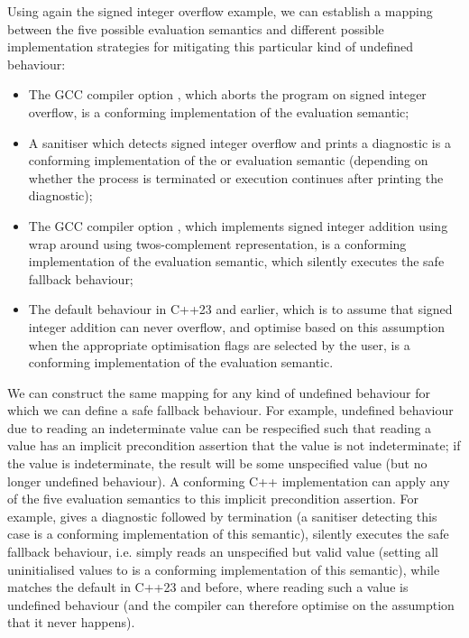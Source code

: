 Using again the signed integer overflow example, we can establish a mapping between the five  possible evaluation semantics and different possible implementation strategies for mitigating this particular kind of undefined behaviour:
\begin{itemize}
\item The GCC compiler option , which aborts the program on signed integer overflow, is a conforming implementation of the  evaluation semantic;
\item A sanitiser which detects signed integer overflow and prints a diagnostic is a conforming implementation of the  or  evaluation semantic (depending on whether the process is terminated or execution continues after printing the diagnostic);
\item The GCC compiler option , which implements signed integer addition using wrap around using twos-complement representation, is a conforming implementation of the  evaluation semantic, which silently executes the safe fallback behaviour;
\item The default behaviour in C++23 and earlier, which is to assume that signed integer addition can never overflow, and optimise based on this assumption when the appropriate optimisation flags are selected by the user, is a conforming implementation of the  evaluation semantic.
\end{itemize}

We can construct the same mapping for any kind of undefined behaviour for which we can define a safe fallback behaviour. For example, undefined behaviour due to reading an indeterminate value can be respecified such that reading a value has an implicit precondition assertion that the value is not indeterminate; if the value is indeterminate, the result will be some unspecified value (but no longer undefined behaviour). A conforming C++ implementation can apply any of the five evaluation semantics to this implicit precondition assertion. For example,  gives a diagnostic followed by termination (a sanitiser detecting this case is a conforming implementation of this semantic),  silently executes the safe fallback behaviour, i.e. simply reads an unspecified but valid value (setting all uninitialised values to  is a conforming implementation of this semantic), while  matches the default in C++23 and before, where reading such a value is undefined behaviour (and the compiler can therefore optimise on the assumption that it never happens).

